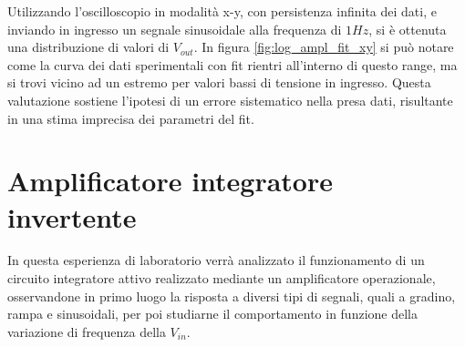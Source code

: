 \documentclass[journal]{IEEEtran}
\begin{document}
Utilizzando l'oscilloscopio in modalità x-y, con persistenza infinita dei dati, e inviando in ingresso un segnale sinusoidale alla frequenza di $1 Hz$, si è ottenuta una distribuzione di valori di $V_{out}$. In figura \ref{fig:log_ampl_fit_xy} si può notare come la curva dei dati sperimentali con fit rientri all'interno di questo range, ma si trovi vicino ad un estremo per valori bassi di tensione in ingresso.
Questa valutazione sostiene l'ipotesi di un errore sistematico nella presa dati, risultante in una stima imprecisa dei parametri del fit.


\section{\textbf{Amplificatore integratore invertente}} %

In questa esperienza di laboratorio verrà analizzato il funzionamento di un circuito integratore attivo realizzato mediante un amplificatore operazionale, osservandone in primo luogo la risposta a diversi tipi di segnali, quali a gradino, rampa e sinusoidali, per poi studiarne il comportamento in funzione della variazione di frequenza della $V_{in}$.
\end{document}
